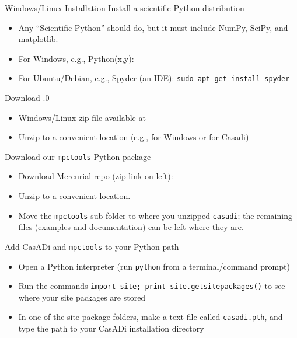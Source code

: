 \documentclass[xcolor=dvipsnames]{beamer}
\begin{document}
%
\begin{frame}[allowframebreaks]{Windows/Linux Installation}
    Install a scientific Python distribution
    \begin{itemize}
        \item Any ``Scientific Python'' should do, but it must include NumPy, SciPy, and matplotlib.
        \item For Windows, e.g., Python(x,y): 
        \item For Ubuntu/Debian, e.g., Spyder (an IDE): \lstinline[style=shell]@sudo apt-get install spyder@
    \end{itemize}
    
    \medskip
    
    Download .0
    \begin{itemize}
        \item Windows/Linux zip file available at 
        \item Unzip to a convenient location (e.g.,  for Windows or  for Casadi)
    \end{itemize}
    
    \framebreak
    
    Download our \texttt{mpctools} Python package
    \begin{itemize}
        \item Download Mercurial repo (zip link on left): 
        \item Unzip to a convenient location.
        \item Move the \texttt{mpctools} sub-folder to where you unzipped \texttt{casadi}; the remaining files (examples and documentation) can be left where they are.
    \end{itemize}
    
    \medskip
    
    Add CasADi and \texttt{mpctools} to your Python path
    \begin{itemize}
        \item Open a Python interpreter (run \lstinline[style=shell]!python! from a terminal/command prompt)
        \item Run the commands \lstinline[style=python]!import site; print site.getsitepackages()! to see where your site packages are stored
        \item In one of the site package folders, make a text file called \texttt{casadi.pth}, and type the path to your CasADi installation directory
    \end{itemize}
\end{frame}
\end{document}

